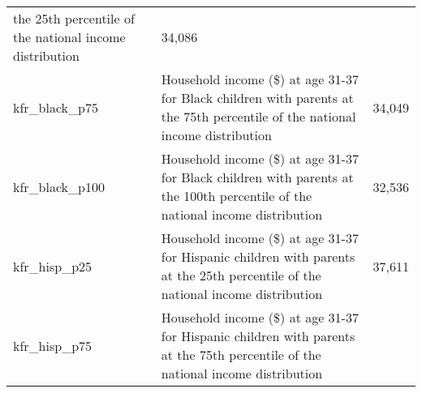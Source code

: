 \documentclass[]{book}
\begin{document}
\begin{longtable}[]{@{}lll@{}}
\begin{minipage}[t]{0.04\columnwidth}
the 25th percentile of the national income distribution\strut
\end{minipage} & \begin{minipage}[t]{0.04\columnwidth}\raggedright\strut
34,086\strut
\end{minipage}\tabularnewline
\begin{minipage}[t]{0.04\columnwidth}\raggedright\strut
kfr\_black\_p75\strut
\end{minipage} & \begin{minipage}[t]{0.04\columnwidth}\raggedright\strut
Household income (\$) at age 31-37 for Black children with parents at
the 75th percentile of the national income distribution\strut
\end{minipage} & \begin{minipage}[t]{0.04\columnwidth}\raggedright\strut
34,049\strut
\end{minipage}\tabularnewline
\begin{minipage}[t]{0.04\columnwidth}\raggedright\strut
kfr\_black\_p100\strut
\end{minipage} & \begin{minipage}[t]{0.04\columnwidth}\raggedright\strut
Household income (\$) at age 31-37 for Black children with parents at
the 100th percentile of the national income distribution\strut
\end{minipage} & \begin{minipage}[t]{0.04\columnwidth}\raggedright\strut
32,536\strut
\end{minipage}\tabularnewline
\begin{minipage}[t]{0.04\columnwidth}\raggedright\strut
kfr\_hisp\_p25\strut
\end{minipage} & \begin{minipage}[t]{0.04\columnwidth}\raggedright\strut
Household income (\$) at age 31-37 for Hispanic children with parents at
the 25th percentile of the national income distribution\strut
\end{minipage} & \begin{minipage}[t]{0.04\columnwidth}\raggedright\strut
37,611\strut
\end{minipage}\tabularnewline
\begin{minipage}[t]{0.04\columnwidth}\raggedright\strut
kfr\_hisp\_p75\strut
\end{minipage} & \begin{minipage}[t]{0.04\columnwidth}\raggedright\strut
Household income (\$) at age 31-37 for Hispanic children with parents at
the 75th percentile of the national income distribution\strut

\end{minipage}
\end{longtable}
\end{document}
